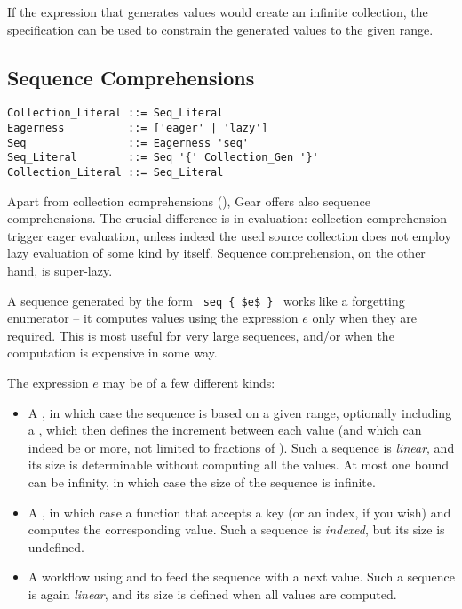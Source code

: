 If the expression that generates values would create an infinite collection, the  specification can be used to constrain the generated values to the given range. 






\subsection{Sequence Comprehensions}
\label{sec:sequence-comprehensions}

\syntax\begin{lstlisting}
Collection_Literal ::= Seq_Literal
Eagerness          ::= ['eager' | 'lazy']
Seq                ::= Eagerness 'seq'
Seq_Literal        ::= Seq '{' Collection_Gen '}'
Collection_Literal ::= Seq_Literal
\end{lstlisting}

Apart from collection comprehensions (), Gear offers also sequence comprehensions. The crucial difference is in evaluation: collection comprehension trigger eager evaluation, unless indeed the used source collection does not employ lazy evaluation of some kind by itself. Sequence comprehension, on the other hand, is super-lazy. 

A sequence generated by the form ~\lstinline!seq { $e$ }!~ works like a forgetting enumerator -- it computes values using the expression $e$ only when they are required. This is most useful for very large sequences, and/or when the computation is expensive in some way. 

The expression $e$ may be of a few different kinds:
\begin{itemize}
  \item A , in which case the sequence is based on a given range, optionally including a , which then defines the increment between each value (and which can indeed be  or more, not limited to fractions of ). Such a sequence is {\em linear}, and its size is determinable without computing all the values. At most one bound can be infinity, in which case the size of the sequence is infinite. 
  \item A , in which case a function that accepts a key (or an index, if you wish) and computes the corresponding value. Such a sequence is {\em indexed}, but its size is undefined. 
  \item A workflow using  and  to feed the sequence with a next value. Such a sequence is again {\em linear}, and its size is defined when all values are computed. 
\end{itemize}

